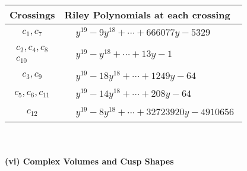 \documentclass[1p]{elsarticle_modified}
\theoremstyle{definition}
\begin{document}
\begin{tabular}{m{50pt}|m{274pt}}
Crossings & \hspace{64pt}Riley Polynomials at each crossing \\
\hline $$\begin{aligned}c_{1},c_{7}\end{aligned}$$&$\begin{aligned}
&y^{19}-9 y^{18}+\cdots+666077 y-5329
\end{aligned}$\\
\hline $$\begin{aligned}c_{2},c_{4},c_{8}\\c_{10}\end{aligned}$$&$\begin{aligned}
&y^{19}- y^{18}+\cdots+13 y-1
\end{aligned}$\\
\hline $$\begin{aligned}c_{3},c_{9}\end{aligned}$$&$\begin{aligned}
&y^{19}-18 y^{18}+\cdots+1249 y-64
\end{aligned}$\\
\hline $$\begin{aligned}c_{5},c_{6},c_{11}\end{aligned}$$&$\begin{aligned}
&y^{19}-14 y^{18}+\cdots+208 y-64
\end{aligned}$\\
\hline $$\begin{aligned}c_{12}\end{aligned}$$&$\begin{aligned}
&y^{19}-8 y^{18}+\cdots+32723920 y-4910656
\end{aligned}$\\
\hline
\end{tabular}\\~\\
\newpage\flushleft \textbf{(vi) Complex Volumes and Cusp Shapes}
\end{document}
